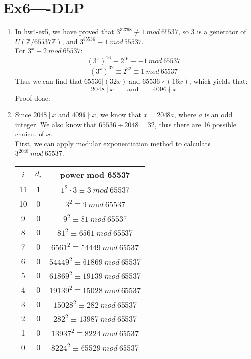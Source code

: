 \documentclass[12pt, a4paper]{article}
\begin{document}
\section*{Ex6----DLP}
\begin{enumerate}
    \item In hw4-ex5, we have proved that $3^{32768} \not\equiv 1\ mod\ 65537$, 
          so 3 is a generator of $U(\mathbb{Z}/65537\mathbb{Z})$, and $3^{65536} \equiv 1\ mod\ 65537$.\\
          For $3^x \equiv 2\ mod\ 65537$:
          $$(3^x)^{16} \equiv 2^{16} \equiv -1\ mod\ 65537$$
          $$(3^x)^{32} \equiv 2^{32} \equiv 1\ mod\ 65537$$
          Thus we can find that $65536|(32x)$ and $65536\nmid (16x)$, which yields that:
          $$2048\ |\ x \qquad \text{and} \qquad 4096 \nmid x$$
          Proof done.
    \item Since $2048\ |\ x$ and $4096 \nmid x$, we know that $x = 2048a$, where $a$ is an odd integer. 
          We also know that $65536 \div 2048 = 32$, thus there are 16 possible choices of $x$.\\
          First, we can apply modular exponentiation method to calculate $3^{2048}\ mod\ 65537$.
          \begin{center}
              \begin{tabular}{c|c|c}
                  $i$ & $d_i$ & power mod 65537\\
                  \hline
                  11 & 1 & $1^2\cdot 3 \equiv 3\ mod\ 65537$\\
                  10 & 0 & $3^2 \equiv 9\ mod\ 65537$\\
                  9 & 0 & $9^2 \equiv 81\ mod\ 65537$\\
                  8 & 0 & $81^2 \equiv 6561\ mod\ 65537$\\
                  7 & 0 & $6561^2 \equiv 54449\ mod\ 65537$\\
                  6 & 0 & $54449^2 \equiv 61869\ mod\ 65537$\\
                  5 & 0 & $61869^2 \equiv 19139\ mod\ 65537$\\
                  4 & 0 & $19139^2 \equiv 15028\ mod\ 65537$\\
                  3 & 0 & $15028^2 \equiv 282\ mod\ 65537$\\
                  2 & 0 & $282^2 \equiv 13987\ mod\ 65537$\\
                  1 & 0 & $13937^2 \equiv 8224\ mod\ 65537$\\
                  0 & 0 & $8224^2 \equiv 65529\ mod\ 65537$

\end{tabular}
\end{center}
\end{enumerate}
\end{document}
